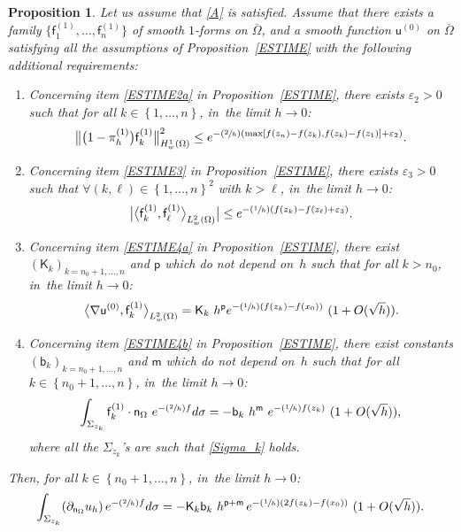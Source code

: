 \documentclass[JEP,XML,SOM,Unicode,NoEqCountersInSection,NoFloatCountersInSection,published]{cedram}
\newcommand{\Psfrac}[2]{(\sfrac{#1}{#2})}
\let\lp\langle
\let\rp\rangle
\let\ve\varepsilon
\theoremstyle{plain}
\newtheorem{proposition}{Proposition}
\theoremstyle{definition}
\begin{document}
\begin{proposition} \label{ESTIME2}
Let us assume that \ref{A} is satisfied. Assume that there exists a family $\{\mathsf f_1^{(1)}, \ldots,
\mathsf f_n^{(1)}\} $ of smooth $1$-forms on $\overline \Omega$, and
a smooth function $\mathsf u^{(0)}$ on $\overline \Omega$ satisfying
all the assumptions of Proposition~\ref{ESTIME} with the following
additional requirements:
\begin{enumerate}
\item\label{ESTIME21}
Concerning item \eqref{ESTIME2a} in Proposition~\ref{ESTIME}, there exists $\ve_2>0$ such that for all $ k\in \left\{1,\ldots,n\right\}$, in~the limit $h\to 0$:
\begin{equation}\label{eq:assump_2a_psi-estime2}
\big \| \bigl(1-\pi_h^{(1)}\bigr) \mathsf f_k^{(1)} \big \|_{H^1_w(\Omega)}^2 \le e^{-\Psfrac{2}{h}(\max[f(z_n)-f(z_k), f(z_k)-f(z_1)] +\ve_2)}.
\end{equation}
\item\label{ESTIME22}
Concerning item \eqref{ESTIME3} in Proposition~\ref{ESTIME},
there exists $\ve_3>0$ such that $\forall (k,\ell)
\in \left\{1,\ldots,n\right\}^2$ with $k>\ell$, in~the limit $h\to 0$:
\[
\big\vert \big\lp\mathsf f_k^{(1)}, \mathsf f_\ell^{(1)}\big\rp_{L^2_w(\Omega)}\big\vert \le e^{-\Psfrac{1}{h}(f(z_k)- f(z_\ell)+\varepsilon_3)}.
\]

\item\label{ESTIME23}
Concerning item \eqref{ESTIME4a} in Proposition~\ref{ESTIME}, there exist $(\mathsf K_k)_{k=n_0+1,\ldots,n}$ and $\mathsf p$ which do not depend on~$h$ such that for all $k>n_0$, in~the limit $h\to 0$:
\begin{equation*}
\big \lp \nabla\mathsf u^{(0)}, \mathsf f_k^{(1)}\big\rp_{L^2_w(\Omega)} = \mathsf K_k\ h^{\mathsf p} e^{-\Psfrac{1}{h}(f(z_k)- f(x_0))} \ (1 + O(\sqrt h)).
\end{equation*}

\item\label{ESTIME24}
Concerning item \eqref{ESTIME4b} in Proposition~\ref{ESTIME}, there exist
constants $(\mathsf b_k)_{k=n_0+1,\ldots,n}$ and $\mathsf m$ which do not depend on~$h$ such that for all $k
\in \left\{n_0+1,\ldots,n\right\}$, in~the limit $h\to 0$:
\begin{equation*}
\int_{\Sigma_{z_k}} \mathsf f_k^{(1)} \cdot \mathsf n_\Omega \ e^{-\Psfrac{2}{h} f} d\sigma =- \mathsf b_k \ h^{\mathsf m } \ e^{-\Psfrac{1}{h} f(z_k)} \ (1 + O(\sqrt h)),
\end{equation*}
where all the $\Sigma_{z_k}$'s are such that \eqref{Sigma_k} holds.
\end{enumerate}

Then, for all $k\in \left\{ n_0+1,\ldots,n\right\}$, in~the limit $h\to 0$:
\begin{equation*}
\int_{\Sigma_{z_k}} (\partial_{\mathsf n_\Omega} u_h)\, e^{-\Psfrac{2}{h}f} d\sigma = -\mathsf K_k \mathsf b_k \ h^{\mathsf p+\mathsf m} \, e^{-\Psfrac{1}{h}(2f(z_k)- f(x_0))} \ (1+ O(\sqrt h)).
\end{equation*}
\end{proposition}
\end{document}
